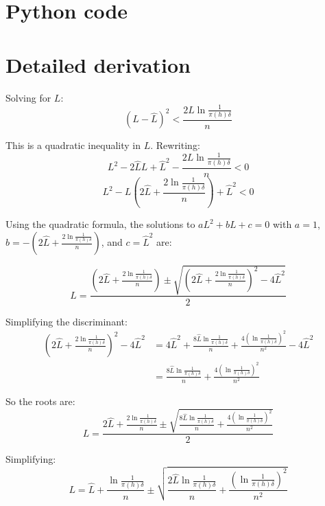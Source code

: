 \section*{Python code}



\section*{Detailed derivation}
Solving for $L$:
$$(L-\hat{L})^2 < \frac{2L\ln\frac{1}{\pi(h)\delta}}{n}$$

This is a quadratic inequality in $L$. Rewriting:
$$L^2 - 2\hat{L}L + \hat{L}^2 - \frac{2L\ln\frac{1}{\pi(h)\delta}}{n} < 0$$
$$L^2 - L\left(2\hat{L} + \frac{2\ln\frac{1}{\pi(h)\delta}}{n}\right) + \hat{L}^2 < 0$$

Using the quadratic formula, the solutions to $aL^2 + bL + c = 0$ with $a = 1$, $b = -\left(2\hat{L} + \frac{2\ln\frac{1}{\pi(h)\delta}}{n}\right)$, and $c = \hat{L}^2$ are:

$$L = \frac{\left(2\hat{L} + \frac{2\ln\frac{1}{\pi(h)\delta}}{n}\right) \pm \sqrt{\left(2\hat{L} + \frac{2\ln\frac{1}{\pi(h)\delta}}{n}\right)^2 - 4\hat{L}^2}}{2}$$

Simplifying the discriminant:
\begin{align*}
\left(2\hat{L} + \frac{2\ln\frac{1}{\pi(h)\delta}}{n}\right)^2 - 4\hat{L}^2 &= 4\hat{L}^2 + \frac{8\hat{L}\ln\frac{1}{\pi(h)\delta}}{n} + \frac{4(\ln\frac{1}{\pi(h)\delta})^2}{n^2} - 4\hat{L}^2 \\
&= \frac{8\hat{L}\ln\frac{1}{\pi(h)\delta}}{n} + \frac{4(\ln\frac{1}{\pi(h)\delta})^2}{n^2}
\end{align*}

So the roots are:
$$L = \frac{2\hat{L} + \frac{2\ln\frac{1}{\pi(h)\delta}}{n} \pm \sqrt{\frac{8\hat{L}\ln\frac{1}{\pi(h)\delta}}{n} + \frac{4(\ln\frac{1}{\pi(h)\delta})^2}{n^2}}}{2}$$

Simplifying:
$$L = \hat{L} + \frac{\ln\frac{1}{\pi(h)\delta}}{n} \pm \sqrt{\frac{2\hat{L}\ln\frac{1}{\pi(h)\delta}}{n} + \frac{(\ln\frac{1}{\pi(h)\delta})^2}{n^2}}$$

